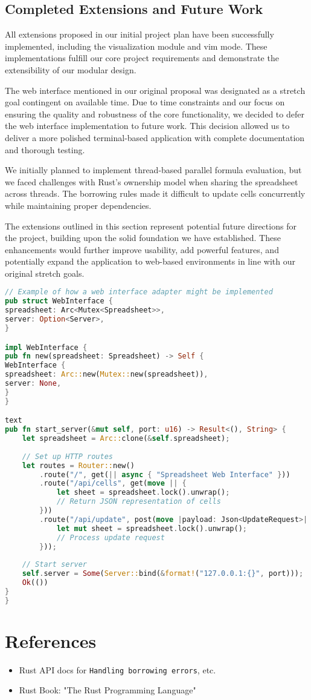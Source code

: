 \documentclass[11pt,a4paper]{article}
\begin{document}
\subsection{Completed Extensions and Future Work}

All extensions proposed in our initial project plan have been successfully implemented, including the visualization module and vim mode. These implementations fulfill our core project requirements and demonstrate the extensibility of our modular design.

The web interface mentioned in our original proposal was designated as a stretch goal contingent on available time. Due to time constraints and our focus on ensuring the quality and robustness of the core functionality, we decided to defer the web interface implementation to future work. This decision allowed us to deliver a more polished terminal-based application with complete documentation and thorough testing.

We initially planned to implement thread-based parallel formula evaluation, but we faced challenges with Rust's ownership model when sharing the spreadsheet across threads. The borrowing rules made it difficult to update cells concurrently while maintaining proper dependencies.

The extensions outlined in this section represent potential future directions for the project, building upon the solid foundation we have established. These enhancements would further improve usability, add powerful features, and potentially expand the application to web-based environments in line with our original stretch goals.

\begin{lstlisting}[language=Rust, caption={Potential future web interface implementation}, label=lst:web-interface]
// Example of how a web interface adapter might be implemented
pub struct WebInterface {
spreadsheet: Arc<Mutex<Spreadsheet>>,
server: Option<Server>,
}

impl WebInterface {
pub fn new(spreadsheet: Spreadsheet) -> Self {
WebInterface {
spreadsheet: Arc::new(Mutex::new(spreadsheet)),
server: None,
}
}

text
pub fn start_server(&mut self, port: u16) -> Result<(), String> {
    let spreadsheet = Arc::clone(&self.spreadsheet);
    
    // Set up HTTP routes
    let routes = Router::new()
        .route("/", get(|| async { "Spreadsheet Web Interface" }))
        .route("/api/cells", get(move || {
            let sheet = spreadsheet.lock().unwrap();
            // Return JSON representation of cells
        }))
        .route("/api/update", post(move |payload: Json<UpdateRequest>| {
            let mut sheet = spreadsheet.lock().unwrap();
            // Process update request
        }));
        
    // Start server
    self.server = Some(Server::bind(&format!("127.0.0.1:{}", port)));
    Ok(())
}
}
\end{lstlisting}

\section*{References}
\begin{itemize}
  \item Rust API docs for \texttt{Handling borrowing errors}, etc.
  
  \item Rust Book: "The Rust Programming Language" 
\end{itemize}
\end{document}
